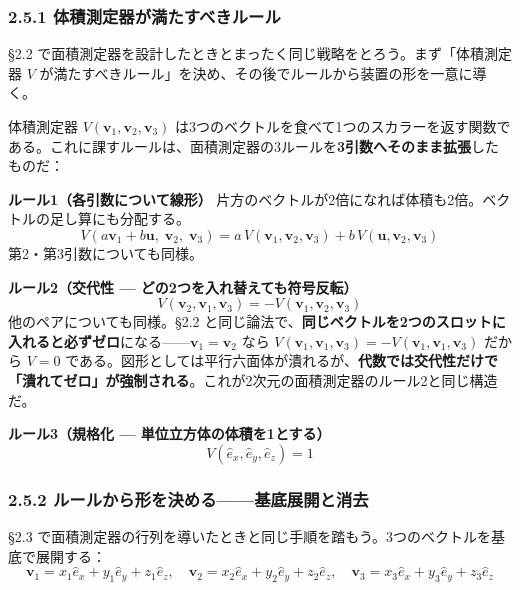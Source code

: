 \documentclass[a4paper,12pt,openany]{book}
\begin{document}
\hypertarget{ux4f53ux7a4dux6e2cux5b9aux5668ux304cux6e80ux305fux3059ux3079ux304dux30ebux30fcux30eb}{%
\subsubsection{2.5.1
体積測定器が満たすべきルール}\label{ux4f53ux7a4dux6e2cux5b9aux5668ux304cux6e80ux305fux3059ux3079ux304dux30ebux30fcux30eb}}

§2.2
で面積測定器を設計したときとまったく同じ戦略をとろう。まず「体積測定器
\(V\)
が満たすべきルール」を決め、その後でルールから装置の形を一意に導く。

体積測定器 \(V(\mathbf{v}_1, \mathbf{v}_2, \mathbf{v}_3)\)
は3つのベクトルを食べて1つのスカラーを返す関数である。これに課すルールは、面積測定器の3ルールを\textbf{3引数へそのまま拡張}したものだ：

\textbf{ルール1（各引数について線形）}
片方のベクトルが2倍になれば体積も2倍。ベクトルの足し算にも分配する。
\[V(a\mathbf{v}_1 + b\mathbf{u},\; \mathbf{v}_2,\; \mathbf{v}_3) = a\,V(\mathbf{v}_1, \mathbf{v}_2, \mathbf{v}_3) + b\,V(\mathbf{u}, \mathbf{v}_2, \mathbf{v}_3)\]
第2・第3引数についても同様。

\textbf{ルール2（交代性 — どの2つを入れ替えても符号反転）}
\[V(\mathbf{v}_2, \mathbf{v}_1, \mathbf{v}_3) = -V(\mathbf{v}_1, \mathbf{v}_2, \mathbf{v}_3)\]
他のペアについても同様。§2.2
と同じ論法で、\textbf{同じベクトルを2つのスロットに入れると必ずゼロ}になる——\(\mathbf{v}_1 = \mathbf{v}_2\)
なら
\(V(\mathbf{v}_1,\mathbf{v}_1,\mathbf{v}_3) = -V(\mathbf{v}_1,\mathbf{v}_1,\mathbf{v}_3)\)
だから \(V=0\)
である。図形としては平行六面体が潰れるが、\textbf{代数では交代性だけで「潰れてゼロ」が強制される}。これが2次元の面積測定器のルール2と同じ構造だ。

\textbf{ルール3（規格化 — 単位立方体の体積を1とする）}
\[V(\hat{e}_x, \hat{e}_y, \hat{e}_z) = 1\]

\hypertarget{ux30ebux30fcux30ebux304bux3089ux5f62ux3092ux6c7aux3081ux308bux57faux5e95ux5c55ux958bux3068ux6d88ux53bb}{%
\subsubsection{2.5.2
ルールから形を決める——基底展開と消去}\label{ux30ebux30fcux30ebux304bux3089ux5f62ux3092ux6c7aux3081ux308bux57faux5e95ux5c55ux958bux3068ux6d88ux53bb}}

§2.3
で面積測定器の行列を導いたときと同じ手順を踏もう。3つのベクトルを基底で展開する：
\[\mathbf{v}_1 = x_1 \hat{e}_x + y_1 \hat{e}_y + z_1 \hat{e}_z, \quad \mathbf{v}_2 = x_2 \hat{e}_x + y_2 \hat{e}_y + z_2 \hat{e}_z, \quad \mathbf{v}_3 = x_3 \hat{e}_x + y_3 \hat{e}_y + z_3 \hat{e}_z\]
\end{document}
